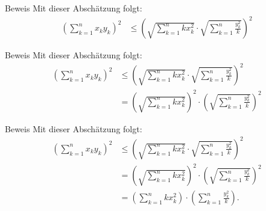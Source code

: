 \documentclass[10pt]{beamer}
\begin{document}
\begin{frame}{Beweis}
    Mit dieser Abschätzung folgt:
    \begin{align*}
        \left( \sum_{k = 1}^{n} x_{k} y_{k} \right)^{2}
        & \leq \left( \sqrt{\sum_{k = 1}^{n} kx_{k}^{2}} \cdot \sqrt{\sum_{k = 1}^{n} \frac{y_{k}^{2}}{k}} \right)^{2}
    \end{align*}
\end{frame}



\begin{frame}{Beweis}
    Mit dieser Abschätzung folgt:
    \begin{align*}
        \left( \sum_{k = 1}^{n} x_{k} y_{k} \right)^{2}
        & \leq \left( \sqrt{\sum_{k = 1}^{n} kx_{k}^{2}} \cdot \sqrt{\sum_{k = 1}^{n} \frac{y_{k}^{2}}{k}} \right)^{2} \\
        & = \left( \sqrt{\sum_{k = 1}^{n} kx_{k}^{2}} \right)^{2} \cdot \left( \sqrt{\sum_{k = 1}^{n} \frac{y_{k}^{2}}{k}} \right)^{2}
    \end{align*}
\end{frame}



\begin{frame}{Beweis}
    Mit dieser Abschätzung folgt:
    \begin{align*}
        \left( \sum_{k = 1}^{n} x_{k} y_{k} \right)^{2}
        & \leq \left( \sqrt{\sum_{k = 1}^{n} kx_{k}^{2}} \cdot \sqrt{\sum_{k = 1}^{n} \frac{y_{k}^{2}}{k}} \right)^{2} \\
        & = \left( \sqrt{\sum_{k = 1}^{n} kx_{k}^{2}} \right)^{2} \cdot \left( \sqrt{\sum_{k = 1}^{n} \frac{y_{k}^{2}}{k}} \right)^{2} \\
        & = \left( \sum_{k = 1}^{n} kx_{k}^{2} \right) \cdot \left( \sum_{k = 1}^{n} \frac{y_{k}^{2}}{k} \right).
    \end{align*}
\end{frame}
\end{document}
